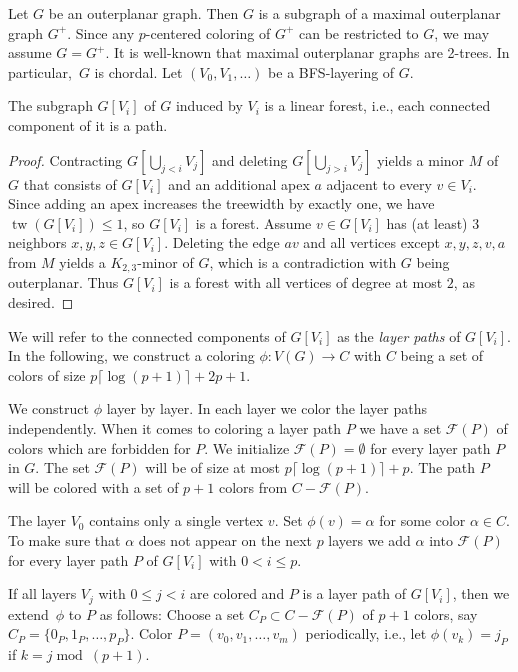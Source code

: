   Let $G$ be an outerplanar graph. Then $G$ is a subgraph of a
  maximal outerplanar graph $G^+$. Since any $p$-centered coloring of
  $G^+$ can be restricted to $G$, we may assume $G=G^+$. It is
  well-known that maximal outerplanar graphs are 2-trees. 
  In particular,~$G$ is chordal. Let $(V_0,V_1,\ldots)$ be a BFS-layering
  of $G$.
\begin{klaim}
  The subgraph $G[V_i]$ of $G$ induced by $V_i$ is a linear forest,
  i.e., each connected component of it is a path.
\end{klaim}
\begin{proof}
  Contracting $G[\bigcup_{j< i} V_j]$ and deleting
  $G[\bigcup_{j> i} V_j]$ yields a minor $M$ of $G$ that consists of
  $G[V_i]$ and an additional apex $a$ adjacent to every $v\in V_i$. 
  Since adding an apex increases
  the treewidth by exactly one, we have $\operatorname{tw}(G[V_i])\leq 1$, so $G[V_i]$ is a
  forest. Assume $v\in G[V_i]$ has (at least) 3 neighbors
  $x,y,z\in G[V_i]$. Deleting the edge $av$ and all vertices except
  $x,y,z,v,a$ from $M$ yields a $K_{2,3}$-minor of $G$, 
  which is a contradiction with $G$ being outerplanar.
  Thus $G[V_i]$ is a forest with all vertices of degree at most $2$, 
  as desired.
\end{proof}

We will refer to the connected components of $G[V_i]$ as the
\emph{layer paths} of $G[V_i]$.
In the following, we construct a coloring
$\phi:V(G) \rightarrow C$ with $C$ being a set of colors 
of size $p\lceil\log(p+1)\rceil + 2p+1$.

We construct $\phi$ layer by layer. 
In each layer we color the layer paths independently. When it comes
to coloring a layer path $P$ we have a set $\mathcal{F}(P)$ of colors which
are forbidden for $P$.
We initialize $\mathcal{F}(P)=\emptyset$ for every layer path $P$ in $G$.
The set $\mathcal{F}(P)$ will be of size at most $p\lceil\log (p+1)\rceil+p$.
The path $P$ will be colored with a set of $p+1$ colors from $C-\mathcal{F}(P)$.

The layer $V_0$ contains only a single vertex $v$. 
Set $\phi(v)=\alpha$ for some color $\alpha\in C$. 
To make
sure that $\alpha$ does not appear on the next $p$ layers we add $\alpha$ 
into $\mathcal{F}(P)$ for every layer path $P$ of $G[V_i]$ with
$0 < i \leq p$.

If all layers $V_j$ with $0\leq j <i$ are colored and $P$ is a layer path 
of $G[V_i]$, then we extend~$\phi$ to $P$ as follows: 
Choose a set $C_P \subset C-\mathcal{F}(P)$ of $p+1$ colors, say 
$C_P =\{0_P,1_P,\ldots,p_P\}$.  
Color $P=(v_0,v_1,\ldots,v_m)$ periodically, i.e., let
$\phi(v_k)=j_P$ if $k=j \operatorname{mod}\ (p+1)$.  

